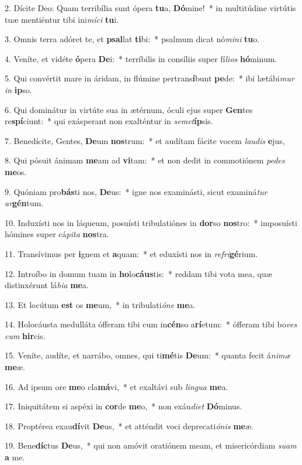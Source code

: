 2. Dícite Deo: Quam terribília sunt ópera \textbf{tu}a, \textbf{Dó}mine!~*  in multitúdine virtútis tuæ mentiéntur tibi ini\textit{mí}\textit{ci} \textbf{tu}i.\

3. Omnis terra adóret te, et \textbf{psal}lat \textbf{ti}bi:~*  psalmum dicat nó\textit{mi}\textit{ni} \textbf{tu}o.\

4. Veníte, et vidéte \textbf{ó}pera \textbf{De}i:~*  terríbilis in consíliis super fí\textit{li}\textit{os} \textbf{hó}minum.\

5. Qui convértit mare in áridam, in flúmine pertrans\textbf{í}bunt \textbf{pe}de:~*  ibi lætábi\textit{mur} \textit{in} \textbf{ip}so.\

6. Qui dominátur in virtúte sua in ætérnum, óculi ejus super \textbf{Gen}tes re\textbf{spí}ciunt:~*  qui exásperant non exalténtur in \textit{se}\textit{met}\textbf{íp}sis.\

7. Benedícite, Gentes, \textbf{De}um \textbf{nos}trum:~*  et audítam fácite vocem \textit{lau}\textit{dis} \textbf{e}jus,\

8. Qui pósuit ánimam \textbf{me}am ad \textbf{vi}tam:~*  et non dedit in commotiónem \textit{pe}\textit{des} \textbf{me}os.\

9. Quóniam pro\textbf{bás}ti nos, \textbf{De}us:~*  igne nos examinásti, sicut examiná\textit{tur} \textit{ar}\textbf{gén}tum.\

10. Induxísti nos in láqueum, posuísti tribulatiónes in \textbf{dor}so \textbf{nos}tro:~*  imposuísti hómines super cá\textit{pi}\textit{ta} \textbf{nos}tra.\

11. Transívimus per \textbf{i}gnem et \textbf{a}quam:~*  et eduxísti nos in \textit{re}\textit{fri}\textbf{gé}rium.\

12. Introíbo in domum tuam in \textbf{ho}lo\textbf{cáus}tis:~*  reddam tibi vota mea, quæ distinxérunt lá\textit{bi}\textit{a} \textbf{me}a.\

13. Et locútum \textbf{est} os \textbf{me}um,~*  in tribulati\textit{ó}\textit{ne} \textbf{me}a.\

14. Holocáusta medulláta ófferam tibi cum in\textbf{cén}so a\textbf{rí}etum:~*  ófferam tibi bo\textit{ves} \textit{cum} \textbf{hir}cis.\

15. Veníte, audíte, et narrábo, omnes, qui ti\textbf{mé}tis \textbf{De}um:~*  quanta fecit á\textit{ni}\textit{mæ} \textbf{me}æ.\

16. Ad ipsum ore \textbf{me}o cla\textbf{má}vi,~*  et exaltávi sub \textit{lin}\textit{gua} \textbf{me}a.\

17. Iniquitátem si aspéxi in \textbf{cor}de \textbf{me}o,~*  non exáu\textit{di}\textit{et} \textbf{Dó}minus.\

18. Proptérea exau\textbf{dí}vit \textbf{De}us,~*  et atténdit voci deprecati\textit{ó}\textit{nis} \textbf{me}æ.\

19. Bene\textbf{díc}tus \textbf{De}us,~*  qui non amóvit oratiónem meam, et misericórdiam \textit{su}\textit{am} \textbf{a} me.\

